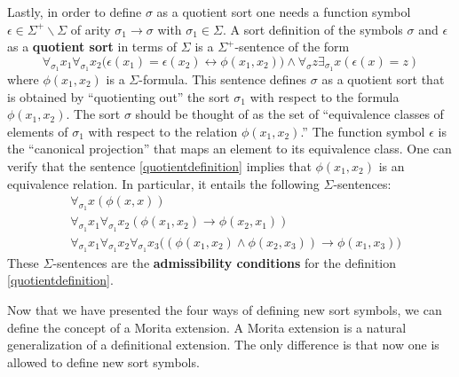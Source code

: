 \begin{tomt} Lastly, in order to define $\sigma$ as a quotient sort
  one needs a function symbol $\epsilon\in\Sigma^+\backslash\Sigma$ of
  arity $\sigma_1\rightarrow\sigma$ with $\sigma_1\in\Sigma$. A sort
  definition of the symbols $\sigma$ and $\epsilon$ as a
  \textbf{quotient sort} in terms of $\Sigma$ is a $\Sigma^+$-sentence
  of the form
\begin{equation}
\label{quotientdefinition}
\forall_{\sigma_1} x_1\forall_{\sigma_1}x_2\big(\epsilon(x_1)=\epsilon(x_2)\leftrightarrow\phi(x_1,x_2)\big) \land\forall_\sigma z\exists_{\sigma_1}x(\epsilon(x)=z)
\end{equation}
where $\phi(x_1,x_2)$ is a $\Sigma$-formula. This sentence defines
$\sigma$ as a quotient sort that is obtained by ``quotienting out''
the sort $\sigma_1$ with respect to the formula $\phi(x_1, x_2)$. The
sort $\sigma$ should be thought of as the set of ``equivalence classes
of elements of $\sigma_1$ with respect to the relation
$\phi(x_1,x_2)$.'' The function symbol $\epsilon$ is the ``canonical
projection'' that maps an element to its equivalence class. One can
verify that the sentence \eqref{quotientdefinition} implies that
$\phi(x_1,x_2)$ is an equivalence relation. In particular, it entails
the following $\Sigma$-sentences:
$$
\begin{aligned}
&\forall_{\sigma_1}x(\phi(x,x))\\
&\forall_{\sigma_1}x_1\forall_{\sigma_1}x_2(\phi(x_1,x_2)\rightarrow\phi(x_2, x_1))\\
&\forall_{\sigma_1}x_1\forall_{\sigma_1}x_2\forall_{\sigma_1}x_3\big((\phi(x_1,x_2)\land\phi(x_2,x_3))\rightarrow\phi(x_1, x_3)\big)
\end{aligned}
$$
These $\Sigma$-sentences are the \textbf{admissibility conditions} for
the definition \eqref{quotientdefinition}. \end{tomt}

Now that we have presented the four ways of defining new sort symbols,
we can define the concept of a Morita extension. A Morita extension is
a natural generalization of a definitional extension. The only
difference is that now one is allowed to define new sort symbols.

